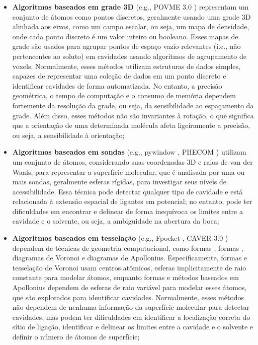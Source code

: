 \documentclass[Portugues]{phdquali}
\def\ie{i.e.\onedot}
\def\eg{e.g.\onedot}
\begin{document}
\begin{itemize}
  \item \textbf{Algoritmos baseados em grade 3D} (\eg, POVME 3.0 \cite{povme}) representam um conjunto de átomos como pontos discretos, geralmente usando uma grade 3D alinhada aos eixos, como um campo escalar, ou seja, um mapa de densidade, onde cada ponto discreto é um valor inteiro ou booleano. Esses mapas de grade são usados para agrupar pontos de espaço vazio relevantes (\ie, não pertencentes ao soluto) em cavidades usando algoritmos de agrupamento de voxels. Normalmente, esses métodos utilizam estruturas de dados simples, capazes de representar uma coleção de dados em um ponto discreto e identificar cavidades de forma automatizada. No entanto, a precisão geométrica, o tempo de computação e o consumo de memória dependem fortemente da resolução da grade, ou seja, da sensibilidade ao espaçamento da grade. Além disso, esses métodos não são invariantes à rotação, o que significa que a orientação de uma determinada molécula afeta ligeiramente a precisão, ou seja, a sensibilidade à orientação;

  \item \textbf{Algoritmos baseados em sondas} (\eg, pywindow \cite{pywindow}, PHECOM \cite{phecom}) utilizam um conjunto de átomos, considerando suas coordenadas 3D e raios de van der Waals, para representar a superfície molecular, que é analisada por uma ou mais sondas, geralmente esferas rígidas, para investigar seus níveis de acessibilidade. Essa técnica pode detectar qualquer tipo de cavidade e está relacionada à extensão espacial de ligantes em potencial; no entanto, pode ter dificuldades em encontrar e delinear de forma inequívoca os limites entre a cavidade e o solvente, ou seja, a ambiguidade na abertura da boca;
  
  \item \textbf{Algoritmos baseados em tesselação} (\eg, Fpocket \cite{fpocket}, CAVER 3.0 \cite{caver3}) dependem de técnicas de geometria computacional, como formas \textalpha, formas \textbeta, diagramas de Voronoi e diagramas de Apollonius. Especificamente, formas \textalpha\space e tesselação de Voronoi usam centros atômicos, esferas implicitamente de raio constante para modelar átomos, enquanto formas \textbeta\space e métodos baseados em Apollonius dependem de esferas de raio variável para modelar esses átomos, que são explorados para identificar cavidades. Normalmente, esses métodos não dependem de nenhuma informação da superfície molecular para detectar cavidades, mas podem ter dificuldades em identificar a localização correta do sítio de ligação, identificar e delinear os limites entre a cavidade e o solvente e definir o número de átomos de superfície;


\end{itemize}
\end{document}
